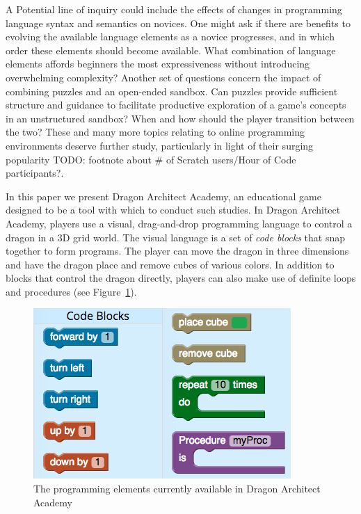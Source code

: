 \documentclass{sig-alternate}
\newcommand{\TODO}[1]{{\color{red} TODO: #1}}
\newcommand{\gametitle}{{\color{RoyalPurple} Dragon Architect Academy}}
\begin{document}
A Potential line of inquiry could include the effects of changes in programming language syntax and semantics on novices. 
One might ask if there are benefits to evolving the available language elements as a novice progresses, and in which order these elements should become available. 
What combination of language elements affords beginners the most expressiveness without introducing overwhelming complexity? Another set of questions concern the impact of combining puzzles and an open-ended sandbox. 
Can puzzles provide sufficient structure and guidance to facilitate productive exploration of a game's concepts in an unstructured sandbox? 
When and how should the player transition between the two? 
These and many more topics relating to online programming environments deserve further study, particularly in light of their surging popularity \TODO{footnote about \# of Scratch users/Hour of Code participants?}. 

In this paper we present \gametitle{}, an educational game designed to be a tool with which to conduct such studies. 
In \gametitle{}, players use a visual, drag-and-drop programming language to control a dragon in a 3D grid world. 
The visual language is a set of \emph{code blocks} that snap together to form programs. 
The player can move the dragon in three dimensions and have the dragon place and remove cubes of various colors. 
In addition to blocks that control the dragon directly, players can also make use of definite loops and procedures (see Figure~\ref{fig:toolbox}).

\begin{figure}[ht]
  \centering
  \includegraphics[width=\columnwidth]{images/toolbox_wide}
  \caption{The programming elements currently available in \gametitle{}}
  \label{fig:toolbox}
\end{figure}
\end{document}
